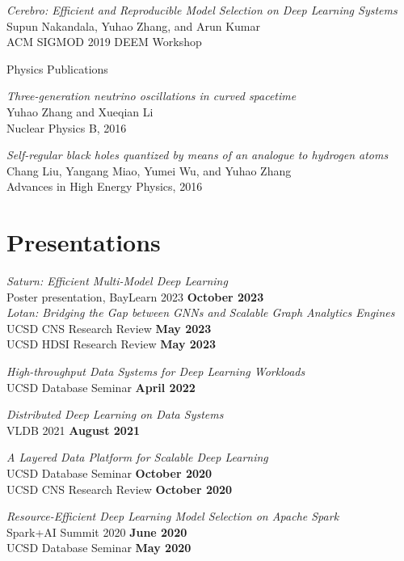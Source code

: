 \documentclass[margin,line]{res}
\begin{document}
\begin{resume}
\textit{Cerebro: Efficient and Reproducible Model Selection on Deep Learning Systems}\\
Supun Nakandala, Yuhao Zhang, and Arun Kumar\\
ACM SIGMOD 2019 DEEM Workshop

{\sc Physics Publications}

\textit{Three-generation neutrino oscillations in curved spacetime}\\
Yuhao Zhang and Xueqian Li\\
Nuclear Physics B, 2016

\textit{Self-regular black holes quantized by means of an analogue to hydrogen atoms}\\
Chang Liu, Yangang Miao, Yumei Wu, and Yuhao Zhang\\
Advances in High Energy Physics, 2016

\section{\sc Presentations}
\textit{Saturn: Efficient Multi-Model Deep Learning}\\
Poster presentation, BayLearn 2023 \hfill {\bf October 2023}\\


\textit{Lotan: Bridging the Gap between GNNs and Scalable Graph Analytics Engines}\\
UCSD CNS Research Review \hfill {\bf May 2023}\\
UCSD HDSI Research Review \hfill {\bf May 2023}

\textit{High-throughput Data Systems for Deep Learning Workloads}\\
UCSD Database Seminar \hfill {\bf April 2022}

\textit{Distributed Deep Learning on Data Systems}\\
VLDB 2021 \hfill {\bf August 2021}

\textit{A Layered Data Platform for Scalable Deep Learning}\\
UCSD Database Seminar \hfill {\bf October 2020}\\
UCSD CNS Research Review \hfill {\bf October 2020}

\vspace{-3mm}
\textit{Resource-Efficient Deep Learning Model Selection on Apache Spark}\\
Spark+AI Summit 2020 \hfill {\bf June 2020}\\
UCSD Database Seminar \hfill {\bf May 2020}


\end{resume}
\end{document}

